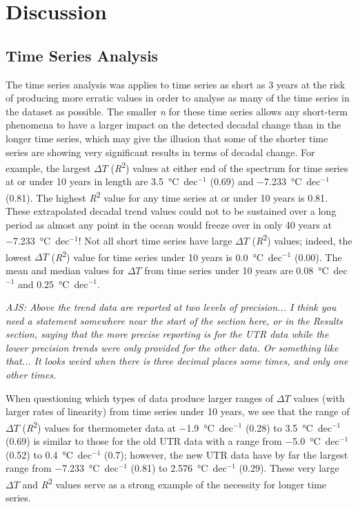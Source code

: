 \documentclass{ametsoc}
\begin{document}
\section{Discussion}

\subsection{Time Series Analysis}
The time series analysis was applies to time series as short as 3 years at the risk of producing more erratic values in order to analyse as many of the time series in the dataset as possible. The smaller \emph{n} for these time series allows any short-term phenomena to have a larger impact on the detected decadal change than in the longer time series, which may give the illusion that some of the shorter time series are showing very significant results in terms of decadal change. For example, the largest $\Delta T$ (\emph{R}\textsuperscript{2}) values at either end of the spectrum for time series at or under 10 years in length are \SI{3.5}{\degreeCelsius}~dec$^{-1}$ (0.69) and \SI{-7.233}{\degreeCelsius}~dec$^{-1}$ (0.81). The highest \emph{R}\textsuperscript{2} value for any time series at or under 10 years is 0.81. These extrapolated decadal trend values could not to be sustained over a long period as almost any point in the ocean would freeze over in only 40 years at \SI{-7.233}{\degreeCelsius}~dec$^{-1}$! Not all short time series have large $\Delta T$ (\emph{R}\textsuperscript{2}) values; indeed, the lowest $\Delta T$ (\emph{R}\textsuperscript{2}) value for time series under 10 years is \SI{0.0}{\degreeCelsius}~dec$^{-1}$ (0.00). The mean and median values for $\Delta T$ from time series under 10 years are \SI{0.08}{\degreeCelsius}~dec$^{-1}$ and \SI{0.25}{\degreeCelsius}~dec$^{-1}$.

\emph{AJS: Above the trend data are reported at two levels of precision... I think you need a statement somewhere near the start of the section here, or in the Results section, saying that the more precise reporting is for the UTR data while the lower precision trends were only provided for the other data. Or something like that... It looks weird when there is three decimal places some times, and only one other times.}

When questioning which types of data produce larger ranges of $\Delta T$ values (with larger rates of linearity) from time series under 10 years, we see that the range of $\Delta T$ (\emph{R}\textsuperscript{2}) values for thermometer data at \SI{-1.9}{\degreeCelsius}~dec$^{-1}$ (0.28) to \SI{3.5}{\degreeCelsius}~dec$^{-1}$ (0.69) is similar to those for the old UTR data with a range from \SI{-5.0}{\degreeCelsius}~dec$^{-1}$ (0.52) to \SI{0.4}{\degreeCelsius}~dec$^{-1}$ (0.7); however, the new UTR data have by far the largest range from \SI{-7.233}{\degreeCelsius}~dec$^{-1}$ (0.81) to \SI{2.576}{\degreeCelsius}~dec$^{-1}$ (0.29). These very large $\Delta T$ and \emph{R}\textsuperscript{2} values serve as a strong example of the necessity for longer time series.
\end{document}
